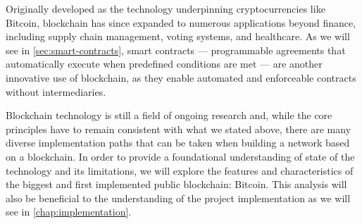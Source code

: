 Originally developed as the technology underpinning cryptocurrencies like Bitcoin, blockchain has since
expanded to numerous applications beyond finance, including supply chain management, voting systems, and healthcare.
As we will see in \ref{sec:smart-contracts}, smart contracts — programmable agreements that automatically execute
when predefined conditions are met — are another innovative use of blockchain, as they enable automated and
enforceable contracts without intermediaries.

Blockchain technology is still a field of ongoing research and, while the core principles have to remain
consistent with what we stated above, there are many diverse implementation paths that can be taken when
building a network based on a blockchain.
In order to provide a foundational understanding of state of the technology and its limitations, we will
explore the features and characteristics of the biggest and first implemented public blockchain: Bitcoin.
This analysis will also be beneficial to the understanding of the project implementation as we will see in
\ref{chap:implementation}.
